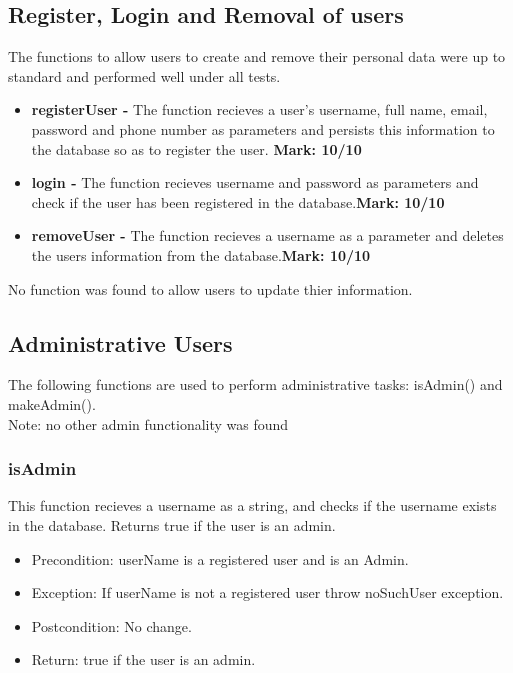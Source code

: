 \documentclass[12pt]{article}
\begin{document}
	\subsection{Register, Login and Removal of users}
		The functions to allow users to create and remove their personal data were up to standard and performed well under all tests.

		\begin{itemize}
			\item \textbf{registerUser - }The function recieves a user's username, full name, email, password and phone number as parameters and persists this information to the database so as to register the user. \textbf{Mark: 10/10}
			\item\textbf{login - }The function recieves username and password as parameters and check if the user has been registered in the database.\textbf{Mark: 10/10}
			\item \textbf{removeUser - } The function recieves a username as a parameter and deletes the users information from the database.\textbf{Mark: 10/10}
		\end{itemize}
	
		No function was found to allow users to update thier information.
\pagebreak	
	\subsection{Administrative Users}
		The following functions are used to perform administrative tasks: isAdmin() and makeAdmin(). \\
		\indent * Note: no other admin functionality was found
	
		\subsubsection{isAdmin}
			This function recieves a username as a string, and checks if the username exists in the database. Returns true if the user is an admin.
		
			\begin{itemize}
				\item Precondition: userName is a registered user and is an Admin.
				\item Exception: If userName is not a registered user throw noSuchUser exception.
				\item Postcondition: No change.
				\item Return: true if the user is an admin.
			\end{itemize}
		
\end{document}
